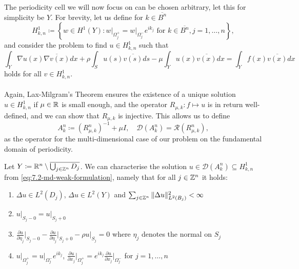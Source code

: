 The periodicity cell we will now focus on can be chosen arbitrary, let this for simplicity be $Y$. For brevity, let us define for $k \in \overline{B^{n}}$ 
\[ H^{1}_{k, n} \coloneqq \left\{ w \in H^{1}(Y) \colon w \big|_{\Omega_{j}^{+}} = w \big|_{\Omega_{j}^{-}} e^{i k_{j}} \text{ for } k \in \overline{B^{n}}, j = 1,\dotsc, n \right\}, \]
 and consider the problem to find $u \in H^{1}_{k, n}$ such that
	\begin{equation}
		\int_{Y} \nabla u(x) \overline{\nabla v(x)} dx + \rho \int_{S} u(s) \overline{v(s)} ds - \mu \int_{Y} u(x) \overline{v(x)} dx = \int_{Y} f(x) \overline{v(x)} dx \label{eq:7.3-md_weak_formulation_res}
	\end{equation} 
holds for all $v \in H^{1}_{k, n}$. 
~\\ ~\\
Again, Lax-Milgram's Theorem ensures the existence of a unique solution $u \in H^{1}_{k, n}$ if $\mu \in \mathbb{R}$ is small enough, and the operator $R_{\mu, k} \colon f \mapsto u$ is in return well-defined, and we can show that $R_{\mu, k}$ is injective. This allows us to define 
	\[ A_{k}^{n} \coloneqq \left(R_{\mu, k}^{n}\right)^{-1} + \mu I, \quad \mathcal{D}(A_{k}^{n}) = \mathcal{R}(R_{\mu, k}^{n}), \]
as the operator for the multi-dimensional case of our problem on the fundamental domain of periodicity.

\begin{theorem} Let $Y \coloneqq \mathbb{R}^{n} \setminus \overline{\bigcup_{j \in \mathbb{Z}^{n}} D_{j}}$. We can characterise the solution $u \in \mathcal{D}(A^{n}_{k}) \subseteq H^{1}_{k, n}$ from \eqref{eq:7.2-md-weak-formulation}, namely that for all $j \in \mathbb{Z}^{n}$ it holds:
	\begin{enumerate}[label=\alph*\upshape)]
		\item $\Delta u \in L^{2}(D_{j})$, $\Delta u \in L^{2}(Y)$ and $\sum_{j \in \mathbb{Z}^{n}} \|\Delta u \|_{L^{2}(B_{j})}^{2} < \infty$
		\item $u \big|_{S_{j} - 0} = u \big|_{S_{j} + 0}$
		\item $\frac{\partial u}{\partial \eta_{j}} \big|_{S_{j} - 0} - \frac{\partial u}{\partial \eta_{j}} \big|_{S_{j} + 0} - \rho u \big|_{S_{j}} = 0$ where $\eta_{j}$ denotes the normal on $S_{j}$ %
		\item $u \big|_{\Omega_{j}^{+}} = u \big|_{\Omega_{j}^{-}} e^{i k_{j}}$, $\frac{\partial u}{\partial x_{j}}\big|_{\Omega_{j}^{+}} = e^{ik_{j}} \frac{\partial u}{\partial x_{j}}\big|_{\Omega_{j}^{-}}$ for $j = 1, \dotsc, n $
	\end{enumerate}
\end{theorem}
	
